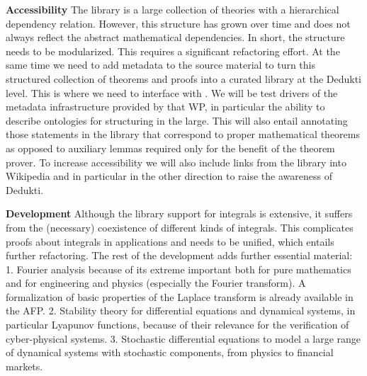 \begin{workpackage}[id=libraries,wphases=0-48,type=RTD,
  short=Libraries,%
  title=Libraries,
  lead=Inr,
  InrRM=10,
  TumRM=39]
\begin{tasklist}
\begin{task}[id=isaAnalysisProb,title=The Isabelle Analysis \& Probability library]
\textbf{Accessibility}\quad
The library is a large collection of theories with a hierarchical dependency
relation. However, this structure has grown over time and does not always
reflect the abstract mathematical dependencies. In short, the structure needs
to be modularized. This requires a significant refactoring effort.
%
At the same time we need to add metadata to the source material to turn this
structured collection of theorems and proofs into a curated library at the
Dedukti level.  This is where we need to interface with . We
will be test drivers of the metadata infrastructure provided by that WP, in
particular the ability to describe ontologies for structuring in the large.
This will also entail annotating those statements in the library that
correspond to proper mathematical theorems as opposed to auxiliary lemmas
required only for the benefit of the theorem prover.
To increase accessibility we will also include links from the library into
Wikipedia and in particular in the other direction to raise the awareness
of Dedukti.

\textbf{Development}\quad
Although the library support for integrals is extensive, it suffers
from the (necessary) coexistence of different kinds of
integrals. This complicates proofs about integrals in applications and needs
to be unified, which entails further refactoring. The rest of the
development adds further essential material:
1. Fourier analysis because of its extreme important both for pure mathematics and for
engineering and physics (especially the Fourier
transform). A formalization of basic properties of the Laplace transform is already available in the AFP. 2. Stability theory for differential equations and
dynamical systems, in particular Lyapunov functions, because of their
relevance for the verification of cyber-physical systems.
3. Stochastic differential equations to model a large range of
dynamical systems with stochastic components, from physics to financial markets.
\end{task}

\begin{task}[id=geocoq,title=The GeoCoq library]
\end{task}

\begin{task}[id=flyspeck,title=The Flyspeck library]
\end{task}


\end{tasklist}
\end{workpackage}
